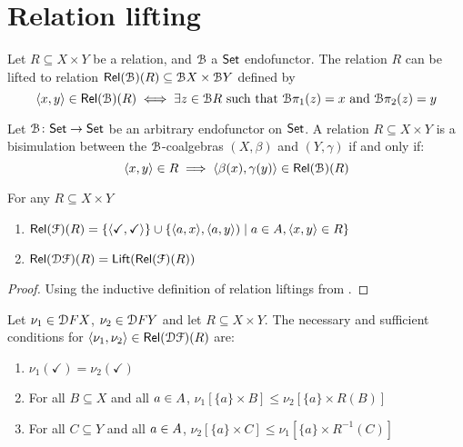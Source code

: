 \section{Relation lifting}
\begin{definition}
    Let $R \subseteq X \times Y$ be a relation, and $\mathcal{B}$ a ${\mathsf{Set}}$ endofunctor. The relation $R$ can be lifted to relation ${\mathsf{Rel}}(\mathcal{B})(R) \subseteq \mathcal{B} X \times \mathcal{B} Y$ defined by
    $$
        \langle x,y \rangle \in {\mathsf{Rel}}(\mathcal{B})(R) \iff \exists z \in \mathcal{B} R \text{ such that } \mathcal{B} \pi_1(z)=x \text{ and } \mathcal{B} \pi_2(z)=y
    $$
\end{definition}
\begin{lemma}\label{apx:lem:relation_lifting_bisim}
    Let $\mathcal{B} \colon {\mathsf{Set}} \to {\mathsf{Set}}$ be an arbitrary endofunctor on ${\mathsf{Set}}$. A relation $R \subseteq X \times Y$ is a bisimulation between the $\mathcal{B}$-coalgebras $(X, \beta)$ and $(Y, \gamma)$ if and only if: 
    $$\langle x,y\rangle \in R \implies \langle \beta(x), \gamma(y) \rangle \in {\mathsf{Rel}}(\mathcal{B})(R)$$
\end{lemma}
\begin{lemma}\label{apx:lem:concrete_liftings}
    For any $R \subseteq {X \times Y}$
    \begin{enumerate}
        \item ${\mathsf{Rel}}(\mathcal{F})(R) = \{\langle \checkmark, \checkmark \rangle\} \cup \{\langle a,x \rangle,\langle a,y \rangle) \mid a \in {A}, \langle x,y \rangle \in R\}$
        \item ${\mathsf{Rel}}(\mathcal{D} \mathcal{F})(R) = \mathsf{Lift}({\mathsf{Rel}}(\mathcal{F})(R))$
    \end{enumerate}
\end{lemma}
\begin{proof}
    Using the inductive definition of relation liftings from \cite[Lemma~3.6.7]{Sokolova:2005:Coalgebraic}.
\end{proof}
\begin{lemma}\label{apx:lem:bisim_characterisation_sublemma}
    Let $\nu_1 \in \mathcal{D} F X$, $\nu_2 \in \mathcal{D} F Y$ and let $R \subseteq X \times Y$. The necessary and sufficient conditions for $\langle \nu_1, \nu_2 \rangle \in {\mathsf{Rel}}(\mathcal{D} \mathcal{F})(R)$ are:
    \begin{enumerate}
        \item $\nu_1(\checkmark)=\nu_2(\checkmark)$
        \item For all $B \subseteq X$ and all $a \in {A}$, $\nu_1[\{a\}\times B] \leq \nu_2[\{a\}\times R(B)]$
        \item For all $C \subseteq Y$ and all $a \in {A}$, $\nu_2[\{a\}\times C] \leq \nu_1[\{a\}\times R^{-1}(C)]$
    \end{enumerate}
\end{lemma}
